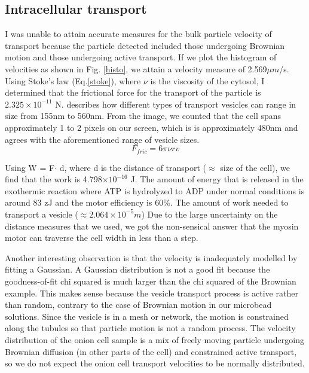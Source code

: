 \documentclass[iop,revtex4]{emulateapj_mod}
\begin{document}
\subsection{Intracellular transport}
\par I was unable to attain accurate measures for the bulk particle velocity of transport because the particle detected included those undergoing Brownian motion and those undergoing active transport. If we plot the histogram of velocities as shown in Fig. \ref{histo}, we attain a velocity measure of 2.569$\mu m$/s.
Using Stoke's law (Eq.\ref{stoke}), where $\nu$ is the viscosity of the cytosol, I determined that the frictional force for the transport of the particle is  $2.325\times 10^{-11}$ N. \cite{size} describes how different types of transport vesicles can range in size from 155nm to 560nm.  From the image, we counted that the cell spans approximately 1 to 2 pixels on our screen, which is is approximately 480nm and agrees with the aforementioned range of vesicle sizes. 
\begin{equation}
\label{stoke}
F_{fric} = 6\pi \nu r v
\end{equation}
\par Using W = F$\cdot$ d, where d is the distance of transport ($\approx$ size of the cell), we find that the work is 4.798$\times 10^{-16}$ J. The amount of energy that is released in the exothermic reaction where  ATP is hydrolyzed to ADP under normal conditions is around 83 zJ \citep{atp} and the motor efficiency is 60\%. The amount of work needed to transport a vesicle ($\approx 2.064\times10^{-5}m$) Due to the large uncertainty on the distance measures that we used, we got the non-sensical answer that the myosin motor can traverse the cell width in less than a step.
\par Another interesting observation is that the velocity is inadequately modelled by fitting a Gaussian. A Gaussian distribution is not a good fit because the goodness-of-fit chi squared is much larger than the chi squared of the Brownian example. This makes sense because the vesicle transport process is active rather than random, contrary to the case of Brownian motion in our microbead solutions. Since the vesicle is in a mesh or network, the motion is constrained along the tubules so that particle motion is not a random process. The velocity distribution of the onion cell sample is a mix of freely moving particle undergoing Brownian diffusion (in other parts of the cell) and constrained active transport, so we do not expect the onion cell transport velocities to be normally distributed. 
\end{document}
